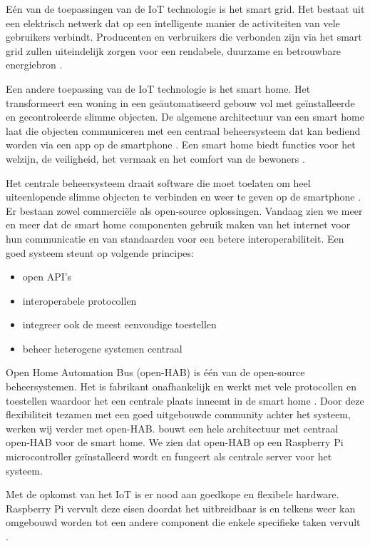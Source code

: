 \documentclass{hogent-article}
\begin{document}
    Eén van de toepassingen van de IoT technologie is het smart grid. Het bestaat uit een elektrisch netwerk dat op een intelligente manier de activiteiten van vele gebruikers verbindt. Producenten en verbruikers die verbonden zijn via het smart grid zullen uiteindelijk zorgen voor een rendabele, duurzame en betrouwbare energiebron \autocite{Kassab_2020} .
    
    Een andere toepassing van de IoT technologie is het smart home. Het transformeert een woning in een geäutomatiseerd gebouw vol met geïnstalleerde en gecontroleerde slimme objecten. De algemene architectuur van een smart home laat die objecten communiceren met een centraal beheersysteem dat kan bediend worden via een app op de smartphone \autocite{Kassab_2020}. Een smart home biedt functies voor het welzijn, de veiligheid, het vermaak en het comfort van de bewoners \autocite{Choi_2021}.
    
    Het centrale beheersysteem draait software die moet toelaten om heel uiteenlopende slimme objecten te verbinden en weer te geven op de smartphone \autocite{Setz_2021}. Er bestaan zowel commerciële als open-source oplossingen. Vandaag zien we meer en meer dat de smart home componenten gebruik maken van het internet voor hun communicatie en van standaarden voor een betere interoperabiliteit. Een goed systeem steunt op volgende principes: \begin{itemize}
        \item open API's
        \item interoperabele protocollen
        \item integreer ook de meest eenvoudige toestellen
        \item beheer heterogene systemen centraal
    \end{itemize}

    Open Home Automation Bus (open-HAB) is één van de open-source beheersystemen. Het is fabrikant onafhankelijk en werkt met vele protocollen en toestellen waardoor het een centrale plaats inneemt in de smart home \autocite{Domb_2019}. Door deze flexibiliteit tezamen met een goed uitgebouwde community achter het systeem, werken wij verder met open-HAB. \textcite{Sowah_2020} bouwt een hele architectuur met centraal open-HAB voor de smart home. We zien dat open-HAB op een Raspberry Pi microcontroller geïnstalleerd wordt en fungeert als centrale server voor het systeem.
    
    Met de opkomst van het IoT is er nood aan goedkope en flexibele hardware. Raspberry Pi vervult deze eisen doordat het uitbreidbaar is en telkens weer kan omgebouwd worden tot een andere component die enkele specifieke taken vervult \autocite{Maksimovic_2015}.
    
\end{document}
